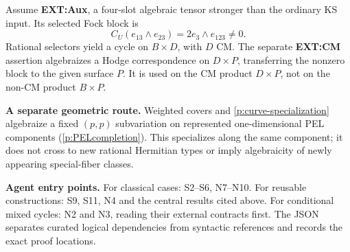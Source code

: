 Assume \textbf{EXT:Aux}, a four-slot algebraic tensor stronger than the ordinary KS input. Its selected Fock block is
\[
 C_U(e_{13}\wedge e_{23})=2e_3\wedge e_{123}\ne0.
\]
Rational selectors yield a cycle on $B\times D$, with $D$ CM. The separate \textbf{EXT:CM} assertion algebraizes a Hodge correspondence on $D\times P$, transferring the nonzero block to the given surface $P$. It is used on the CM product $D\times P$, not on the non-CM product $B\times P$.

\textbf{A separate geometric route.} Weighted covers and \ref{p:curve-specialization} algebraize a fixed $(p,p)$ subvariation on represented one-dimensional PEL components (\ref{p:PELcompletion}). This specializes along the same component; it does not cross to new rational Hermitian types or imply algebraicity of newly appearing special-fiber classes.

\smallskip\noindent\textbf{Agent entry points.} For classical cases: S2--S6, N7--N10. For reusable constructions: S9, S11, N4 and the central results cited above. For conditional mixed cycles: N2 and N3, reading their external contracts first. The JSON separates curated logical dependencies from syntactic references and records the exact proof locations.
\clearpage
